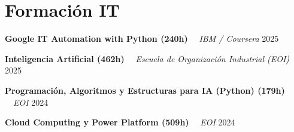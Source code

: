 \documentclass[letterpaper,11pt]{article}
\begin{document}
\section{Formación IT}
    \noindent
    \begin{minipage}[t]{1.0\linewidth}
        {\textbf{Google IT Automation with Python (240h)}} 
        \ \textendash \ 
        {\color{detailgray}\textit{IBM / Coursera}}
        \hfill 
        {\small 2025}
    \end{minipage}
    \par 
    \vspace{0.1cm} %
    \noindent
    \begin{minipage}[t]{1.0\linewidth}
        {\textbf{Inteligencia Artificial (462h)}} 
        \ \textendash \ 
        {\color{detailgray}\textit{Escuela de Organización Industrial (EOI)}}
        \hfill 
        {\small 2025}
    \end{minipage}
    \par 
    \vspace{0.1cm} %
    \noindent
    \begin{minipage}[t]{1.0\linewidth}
        {\textbf{Programación, Algoritmos y Estructuras para IA (Python) (179h)}} 
        \ \textendash \ 
        {\color{detailgray}\textit{EOI}}
        \hfill 
        {\small 2024}
    \end{minipage}
    \par 
    \vspace{0.1cm} %
    \noindent
    \begin{minipage}[t]{1.0\linewidth}
        {\textbf{Cloud Computing y Power Platform (509h)}} 
        \ \textendash \ 
        {\color{detailgray}\textit{EOI}}
        \hfill 
        {\small 2024}
    \end{minipage}
    \par 
    \vspace{0.1cm} %
\end{document}
